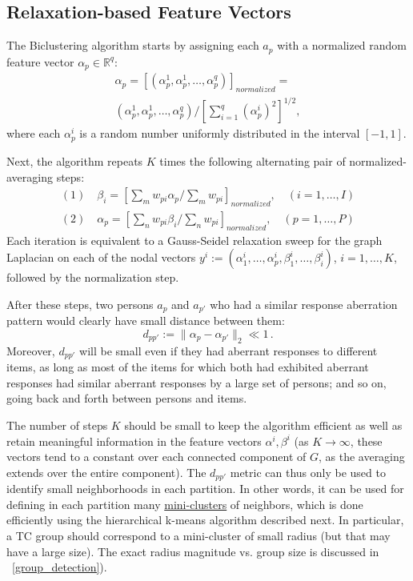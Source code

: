 \documentclass{article}
\newcommand{\R}{\mathbb{R}}
\begin{document}
\subsection{Relaxation-based Feature Vectors}
The Biclustering algorithm starts by assigning each $a_p$ with a normalized random feature vector $\alpha_p \in \R^q$:
\begin{equation}
\begin{split}
  \alpha_p = \left[ (\alpha_p^1,\alpha_p^1,\ldots,\alpha_p^q) \right]_{normalized} =  \\
  (\alpha_p^1,\alpha_p^1,\ldots,\alpha_p^q) /
  \left[ \sum_{i=1}^q (\alpha_p^i)^2 \right]^{1/2},
\end{split}
\end{equation}
where each $\alpha_p^i$ is a random number uniformly distributed in the interval $[-1,1]$. 

Next, the algorithm repeats $K$ times the following alternating pair of normalized-averaging steps:
\begin{equation}
\begin{split}
(1) \quad \beta_i = \left[ \sum_m w_{pi} \alpha_p / \sum_m w_{pi} \right]_{normalized}, \quad (i=1,\ldots,I) \\
(2) \quad \alpha_p = \left[ \sum_n w_{pi} \beta_i / \sum_n w_{pi} \right]_{normalized}, \quad (p=1,\ldots,P) 
\end{split}
\label{eqn:bistep}
\end{equation}
Each iteration is equivalent to a Gauss-Seidel relaxation sweep for the graph Laplacian \cite{lamg} on each of the nodal vectors $y^i := (\alpha_1^i,\dots,\alpha_p^i,\beta_1^i,\dots,\beta_i^i)$, $i=1,\dots,K$, followed by the normalization step.

After these steps, two persons $a_p$ and $a_{p'}$ who had a similar response aberration pattern would clearly have small distance between them:
\begin{equation}
d_{pp'} := \|\alpha_p - \alpha_{p'} \|_2 \ll 1\,.
\end{equation}
Moreover, $d_{pp'}$ will be small even if they had aberrant responses to different items, as long as most of the items for which both had exhibited aberrant responses had similar aberrant responses by a large set of persons; and so on, going back and forth between persons and items.

The number of steps $K$ should be small to keep the algorithm efficient as well as retain meaningful information in the feature vectors $\alpha^i, \beta^i$ (as $K \rightarrow \infty$, these vectors tend to a constant over each connected component of $G$, as the averaging extends over the entire component). The $d_{pp'}$ metric can thus only be used to identify small neighborhoods in each partition. In other words, it can be used for defining in each partition many \underline{mini-clusters} of neighbors, which is done efficiently using the hierarchical k-means algorithm described next. In particular, a TC group should correspond to a mini-cluster of small radius (but that may have a large size). The exact radius magnitude vs. group size is discussed in \Sec~\ref{group_detection}).
\end{document}
